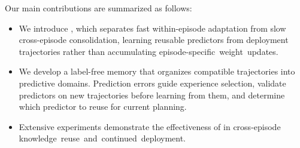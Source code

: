 Our main contributions are summarized as follows:
\begin{itemize}
    \item 
    We introduce \ours{}, which separates fast within-episode adaptation from slow cross-episode consolidation, learning reusable predictors from deployment trajectories rather than accumulating \mbox{episode-specific weight updates}.

    \item 
    We develop a label-free memory that organizes compatible trajectories into predictive domains. Prediction errors guide experience selection, validate predictors on new trajectories before learning from them, and determine which predictor to reuse for current planning.

    \item {} Extensive experiments demonstrate the effectiveness of \ours{} in cross-episode \mbox{knowledge reuse and continued deployment}.
\end{itemize}


